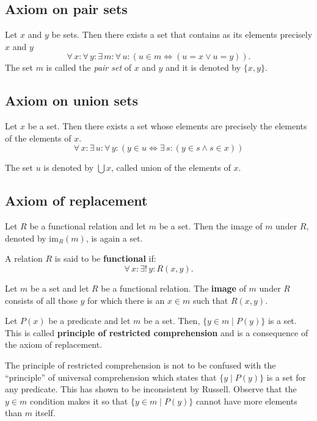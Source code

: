 \documentclass[root.tex]{subfiles}
\begin{document}
\subsection{Axiom on pair sets}
Let $x$ and $y$ be sets. Then there exists a set that contains as its elements precisely $x$ and $y$
$$
\forall \, x : \forall \, y : \exists \, m : \forall \, u : (u\in m \Leftrightarrow (u = x \lor u = y)).
$$
The set $m$ is called the \emph{pair set} of $x$ and $y$ and it is denoted by $\{x,y\}$.

\subsection{Axiom on union sets}
Let $x$ be a set. Then there exists a set whose elements are precisely the elements of the elements of $x$. 
$$
\forall \, x : \exists \, u : \forall \, y : (y \in u \Leftrightarrow \exists \, s :(y \in s\land s \in x))
$$

The set $u$ is denoted by $\bigcup x$, called union of the elements of $x$.

\subsection{Axiom of replacement}
Let $R$ be a functional relation and let $m$ be a set. Then the image of $m$ under $R$, denoted by $\text{im}_R(m)$, is again a set.

\begin{mydef}
A relation $R$ is said to be \textbf{functional} if:
$$
\forall \, x : \exists ! \, y : R(x,y) .
$$
\end{mydef}

\begin{mydef}
  Let $m$ be a set and let $R$ be a functional relation. The \textbf{image} of $m$ under $R$ consists of all those $y$ for which there is an $x\in m$ such that $R(x,y)$. 
\end{mydef}

\begin{theorem}
  Let $P(x)$ be a predicate and let $m$ be a set. Then, $\{y \in m \mid P(y)\}$ is a set. This is called \textbf{principle of restricted comprehension} and is a consequence of the axiom of replacement.
\end{theorem}

The principle of restricted comprehension is not to be confused with the ``principle'' of universal comprehension which states that $\{y \mid P(y)\} $ is a set for any predicate. This has shown to be inconsistent by Russell. Observe that the $y \in m$ condition makes it so that $\{y \in m \mid P(y)\}$ cannot have more elements than $m$ itself.
\end{document}
